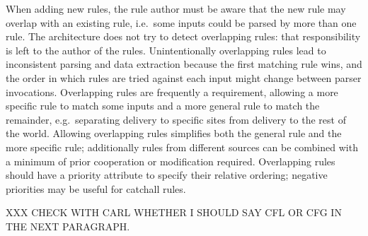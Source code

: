 When adding new rules, the rule author must be aware that the new rule may
overlap with an existing rule, i.e.\ some inputs could be parsed by more
than one rule.  The architecture does not try to detect overlapping rules:
that responsibility is left to the author of the rules.  Unintentionally
overlapping rules lead to inconsistent parsing and data extraction because
the first matching rule wins, and the order in which rules are tried
against each input might change between parser invocations.  Overlapping
rules are frequently a requirement, allowing a more specific rule to match
some inputs and a more general rule to match the remainder, e.g.\
separating  delivery to specific sites from 
delivery to the rest of the world.  Allowing overlapping rules simplifies
both the general rule and the more specific rule; additionally rules from
different sources can be combined with a minimum of prior cooperation or
modification required.  Overlapping rules should have a priority attribute
to specify their relative ordering; negative priorities may be useful for
catchall rules.

XXX CHECK WITH CARL WHETHER I SHOULD SAY CFL OR CFG IN THE NEXT
PARAGRAPH\@.

